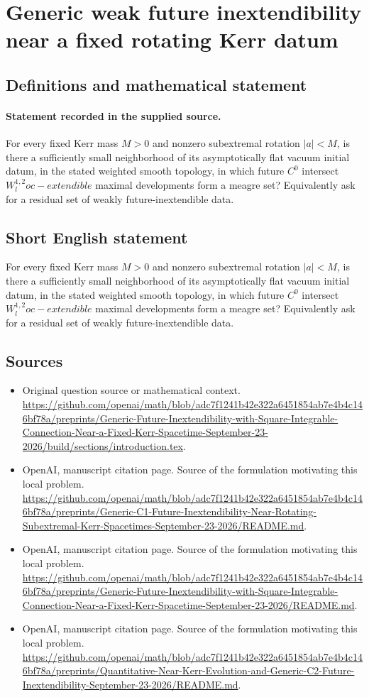 \documentclass[11pt]{article}
\begin{document}
\section*{Generic weak future inextendibility near a fixed rotating Kerr datum}\label{statement}
\subsection{Definitions and mathematical statement}
\paragraph{Statement recorded in the supplied source.}
For every fixed Kerr mass $M>0$ and nonzero subextremal rotation $|a|<M$, is there a sufficiently small neighborhood of its asymptotically flat vacuum initial datum, in the stated weighted smooth topology, in which future $C^0$ intersect $W^{1,2}_loc-extendible$ maximal developments form a meagre set? Equivalently ask for a residual set of weakly future-inextendible data.
\subsection{Short English statement}
For every fixed Kerr mass $M>0$ and nonzero subextremal rotation $|a|<M$, is there a sufficiently small neighborhood of its asymptotically flat vacuum initial datum, in the stated weighted smooth topology, in which future $C^0$ intersect $W^{1,2}_loc-extendible$ maximal developments form a meagre set? Equivalently ask for a residual set of weakly future-inextendible data.
\subsection{Sources}
\begin{itemize}
\item[S1] Original question source or mathematical context.
\url{https://github.com/openai/math/blob/adc7f1241b42e322a6451854ab7e4b4c146bf78a/preprints/Generic-Future-Inextendibility-with-Square-Integrable-Connection-Near-a-Fixed-Kerr-Spacetime-September-23-2026/build/sections/introduction.tex}.
\item[S2] OpenAI, manuscript citation page. Source of the formulation motivating this local problem.
\url{https://github.com/openai/math/blob/adc7f1241b42e322a6451854ab7e4b4c146bf78a/preprints/Generic-C1-Future-Inextendibility-Near-Rotating-Subextremal-Kerr-Spacetimes-September-23-2026/README.md}.
\item[S3] OpenAI, manuscript citation page. Source of the formulation motivating this local problem.
\url{https://github.com/openai/math/blob/adc7f1241b42e322a6451854ab7e4b4c146bf78a/preprints/Generic-Future-Inextendibility-with-Square-Integrable-Connection-Near-a-Fixed-Kerr-Spacetime-September-23-2026/README.md}.
\item[S4] OpenAI, manuscript citation page. Source of the formulation motivating this local problem.
\url{https://github.com/openai/math/blob/adc7f1241b42e322a6451854ab7e4b4c146bf78a/preprints/Quantitative-Near-Kerr-Evolution-and-Generic-C2-Future-Inextendibility-September-23-2026/README.md}.
\end{itemize}
\end{document}

